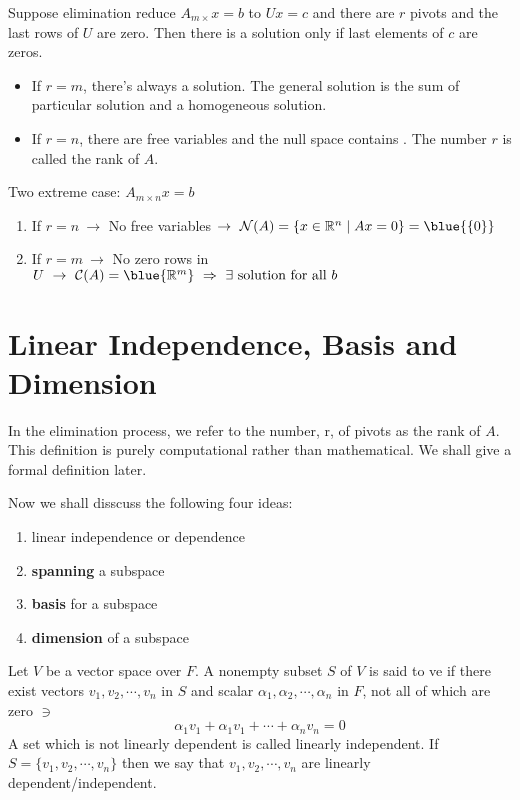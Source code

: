 \begin{theorem}
    Suppose elimination reduce $A_{m \times } x = b$ to $Ux = c$ and there are $r$ pivots and the last  rows of $U$ are zero. Then there is a solution only if last  elements of $c$ are zeros.
    \begin{itemize}
        \item If $r = m$, there's always a solution. The general solution is the sum of particular solution and a homogeneous solution.
        \item If $r = n$, there are  free variables and the null space contains . The number $r$ is called the rank of $A$.
    \end{itemize} 
    Two extreme case: $A_{m\times n}x = b$
    \begin{enumerate}[label=(\arabic*)]
        \item If $r = n \ \rightarrow$ No free variables $\rightarrow \ \mathcal{N}(A) = \{x \in \mathbb{R}^n \;|\; Ax = 0\} = \blue{\{0\}}$ 
        \item If $r = m \ \rightarrow$ No zero rows in $U \ \rightarrow \ \mathcal{C}(A) = \blue{\mathbb{R}^m} \ \Rightarrow \ \exists \ \text{solution for all }b$
    \end{enumerate}
\end{theorem}

\section{Linear Independence, Basis and Dimension}

In the elimination process, we refer to the number, r, of pivots as the rank of $A$. This definition is purely computational rather than mathematical. We shall give a formal definition later.

Now we shall disscuss the following four ideas:
\begin{enumerate}[label=(\roman*)]
    \item linear independence or dependence
    \item \textbf{spanning} a subspace
    \item \textbf{basis} for a subspace
    \item \textbf{dimension} of a subspace
\end{enumerate}

\newpage

\begin{definition}
    Let $V$ be a vector space over $F$. A nonempty subset $S$ of $V$ is said to ve  if there exist  vectors $v_1, v_2, \cdots, v_n$ in $S$ and scalar $\alpha_1, \alpha_2, \cdots, \alpha_n$ in $F$, not all of which are zero $\ni$
    \[
    \alpha_1 v_1 + \alpha_1 v_1 + \cdots + \alpha_n v_n = 0
    \]
    A set which is not linearly dependent is called linearly independent. If $S = \{v_1, v_2, \cdots, v_n\}$ then we say that $v_1, v_2, \cdots, v_n$ are linearly dependent/independent.
\end{definition}

